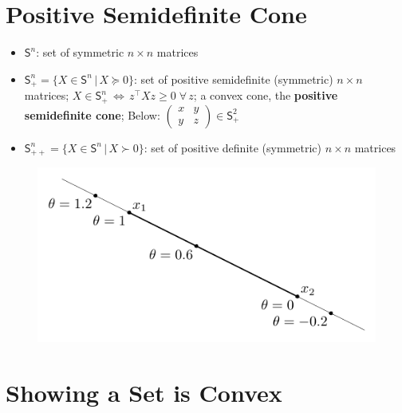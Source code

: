\documentclass[11pt]{extarticle}
\newcommand{\ds}{\displaystyle}
\newcommand{\ifff}{\,\Longleftrightarrow\,}
\theoremstyle{definition}
\begin{document}
\section*{Positive Semidefinite Cone}
\begin{itemize}
  \item $\mathsf{S}^n$: set of symmetric $n\times n$ matrices
  \item $\ds\mathsf{S}^n_+ = \{X\in\mathsf{S}^n\,|\,X\succcurlyeq 0\}$: set of positive semidefinite (symmetric) $n\times n$ matrices; $\ds X\in\mathsf{S}^n_+ \ifff z^\top X z\geqslant 0\;\forall\,z$; a convex cone, the {\bf positive semidefinite cone}; Below: $\ds\begin{pmatrix}x & y \\ y & z\end{pmatrix}\in\mathsf{S}^2_+$
  \item $\ds\mathsf{S}^n_{++} = \{X\in\mathsf{S}^n\,|\,X\succ 0\}$: set of positive definite (symmetric) $n\times n$ matrices
\end{itemize}
\vspace{-6mm}
\begin{figure}[!htbp]
  \centering
  \includegraphics[scale=0.5,page=12]{fig/02.pdf}
\end{figure}

\newpage

\section*{Showing a Set is Convex}
\end{document}
